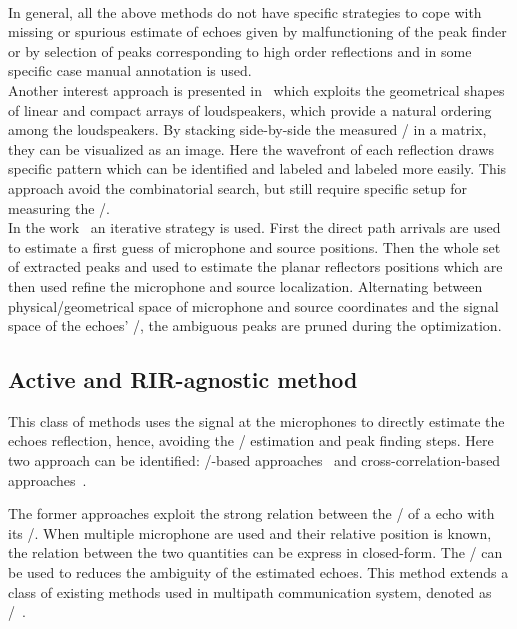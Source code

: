 \\In general, all the above methods do not have specific strategies to cope with missing or spurious estimate of echoes given by malfunctioning of the peak finder or by selection of peaks corresponding to high order reflections and in some specific case manual annotation is used.
\\Another interest approach is presented in~ which exploits the geometrical shapes of linear and compact arrays of loudspeakers, which provide a natural ordering among the loudspeakers.
By stacking side-by-side the measured \RIRs/ in a matrix, they can be visualized as an image.
Here the wavefront of each reflection draws specific pattern which can be identified and labeled and labeled more easily.
This approach avoid the combinatorial search, but still require specific setup for measuring the \RIRs/.
\\In the work~ an iterative strategy is used.
First the direct path arrivals are used to estimate a first guess of microphone and source positions.
Then the whole set of extracted peaks and used to estimate the planar reflectors positions which are then used refine the microphone and source localization.
Alternating between physical/geometrical space of microphone and source coordinates and the signal space of the echoes' \TOAs/, the ambiguous peaks are pruned during the optimization.

\subsection{Active and RIR-agnostic method}
This class of methods uses the signal at the microphones to directly estimate the echoes reflection, hence, avoiding the \RIR/ estimation and peak finding steps.
Here two approach can be identified: \ML/-based approaches~ and cross-correlation-based approaches~.

The former approaches exploit the strong relation between the \TOA/ of a echo with its \DOA/.
When multiple microphone are used and their relative position is known, the relation between the two quantities can be express in closed-form.
The \DOAs/ can be used to reduces the ambiguity of the estimated echoes.
This method extends a class of existing methods used in multipath communication system, denoted as \JADE/~.

